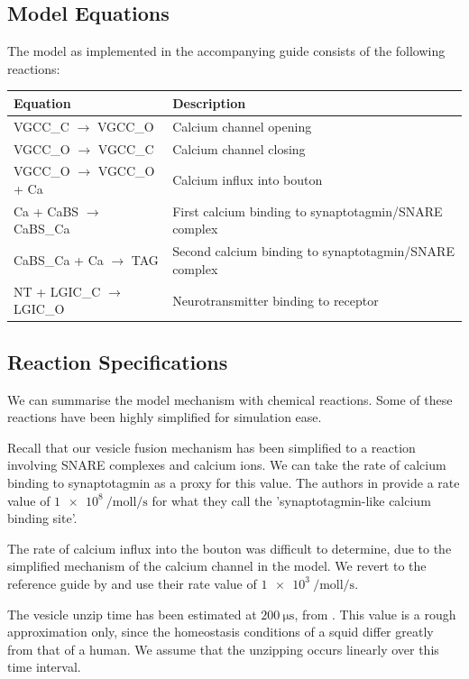 \documentclass[a4paper]{article}
\begin{document}
\subsection{Model Equations}
The model as implemented in the accompanying guide consists of the following reactions:
\begin{table}[H]
\begin{tabular}{ll}
Equation & Description \\ \hline
VGCC\_C $\to$ VGCC\_O & Calcium channel opening \\
VGCC\_O $\to$ VGCC\_C & Calcium channel closing \\
VGCC\_O $\to$ VGCC\_O + Ca & Calcium influx into bouton \\
Ca + CaBS $\to$ CaBS\_Ca & First calcium binding to synaptotagmin/SNARE complex  \\ 
CaBS\_Ca + Ca $\to$ TAG & Second calcium binding to synaptotagmin/SNARE complex  \\
NT + LGIC\_C $\to$ LGIC\_O& Neurotransmitter binding to receptor \\
\end{tabular} 
\end{table}


\subsection{Reaction Specifications}
We can summarise the model mechanism with chemical reactions. Some of these reactions have been highly simplified for simulation ease.

Recall that our vesicle fusion mechanism has been simplified to a reaction involving SNARE complexes and calcium ions. We can take the rate of calcium binding to synaptotagmin as a proxy for this value. The authors in \cite{ma2014quantitative} provide a rate value of $\SI{1e8}{\per\mol\litre\per\second}$ for what they call the 'synaptotagmin-like calcium binding site'. 

The rate of calcium influx into the bouton was difficult to determine, due to the simplified mechanism of the calcium channel in the model. We revert to the reference guide by \cite{Czech:MethodsMolBiol:2009} and use their rate value of $\SI{1e3}{\per\mole\litre\per\second}$.

The vesicle unzip time has been estimated at $\SI{200}{\micro\second}$, from \cite{Llinas:TheSquidGiantSynapseAModel:1999}. This value is a rough approximation only, since the homeostasis conditions of a squid differ greatly from that of a human. We assume that the unzipping occurs linearly over this time interval.
\end{document}
